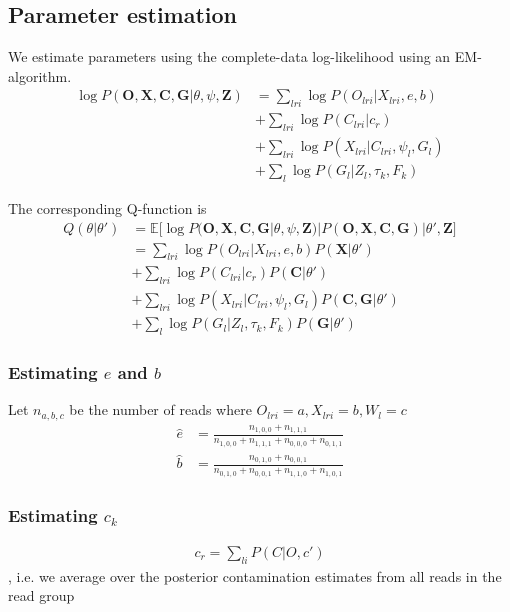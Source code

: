 \documentclass[10pt,a4paper]{article}
\begin{document}
\subsection*{Parameter estimation}
We estimate parameters using the complete-data log-likelihood using an EM-algorithm.
\begin{align*}
\log P(\mathbf{O}, \mathbf{X}, \mathbf{C}, \mathbf{G} | \theta, \psi, \mathbf{Z}) &= 
\sum_{lri} \log P(O_{lri} | X_{lri}, e, b)\\
&+ \sum_{lri}\log P(C_{lri} | c_r)\\
&+ \sum_{lri}\log P(X_{lri} | C_{lri}, \psi_l, G_l)\\
&+ \sum_{l} \log P( G_l | Z_l, \tau_k, F_k)
\end{align*}

The corresponding Q-function is \begin{align*}
Q(\theta | \theta') &= \mathbb{E}\big[\log P(\mathbf{O}, \mathbf{X}, \mathbf{C}, \mathbf{G} | \theta, \psi, \mathbf{Z}) | P(\mathbf{O, X, C, G}) | \theta', \mathbf{Z} \big]\\ &= 
\sum_{lri} \log P(O_{lri} | X_{lri}, e, b) P(\mathbf{X} | \theta')\\
&+ \sum_{lri}\log P(C_{lri} | c_r) P(\mathbf{C} | \theta')\\
&+ \sum_{lri}\log P(X_{lri} | C_{lri}, \psi_l, G_l)P(\mathbf{C,G} | \theta')\\
&+ \sum_{l} \log P( G_l | Z_l, \tau_k, F_k) P(\mathbf{G} | \theta')
\end{align*}


\subsubsection*{Estimating $e$ and $b$}
Let $n_{a,b,c}$ be the number of reads where $O_{lri}=a, X_{lri}=b, W_l=c$
\begin{align*}
\hat{e} & = \frac{n_{1,0,0} + n_{1,1,1}}{n_{1,0,0} + n_{1,1,1} + n_{0,0,0} +n_{0, 1, 1}}\\
\hat{b} & = \frac{n_{0,1,0} + n_{0, 0,1}}{n_{0, 1, 0} + n_{0, 0, 1} + n_{1, 1, 0} +n_{1, 0, 1}}
\end{align*}
\subsubsection*{Estimating $c_k$}
\begin{align*}
c_r =  \sum_{li} P(C| O, c')
\end{align*},
i.e. we average over the posterior contamination estimates from all reads in the read group
\end{document}
